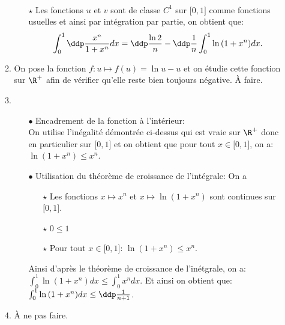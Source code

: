 \documentclass[a4paper, 11pt,reqno]{article}
\begin{document}
\begin{correction}
\begin{enumerate}
\begin{enumerate}
\begin{itemize}
$$\begin{array}{lllllll}
					                  \end{array}$$
				            \item[$\star$] Les fonctions $u$ et $v$ sont de classe $C^1$ sur $\lbrack 0,1\rbrack$ comme fonctions usuelles et ainsi par int\'egration par partie, on obtient que:
				                  $$\int_0^1 \ddp\frac{x^n}{1+x^n} dx = \ddp\frac{\ln{2}}{n}-\ddp\frac{1}{n}\int_0^1 \ln{(1+x^n)}dx  .$$
			            \end{itemize}
			      \item On pose la fonction $f: u\mapsto f(u)=\ln{u}-u$ et on \'etudie cette fonction sur $\R^{+}$ afin de v\'erifier qu'elle reste bien toujours n\'egative. \`{A} faire.
			      \item
			            \begin{itemize}
				            \item[$\bullet$] Encadrement de la fonction \`{a} l'int\'erieur:\\
				                  \noindent On utilise l'in\'egalit\'e d\'emontr\'ee ci-dessus qui est vraie sur $\R^+$ donc en particulier sur $\lbrack 0,1\rbrack$ et on obtient que pour tout $x\in\lbrack 0,1\rbrack$, on a: $\ln{(1+x^n)}\leq x^n$.
				            \item[$\bullet$] Utilisation du th\'eor\`{e}me de croissance de l'int\'egrale: On a
				                  \begin{itemize}
					                  \item[$\star$] Les fonctions $x\mapsto x^n$ et $x\mapsto \ln{(1+x^n)}$ sont continues sur $\lbrack 0,1\rbrack$.
					                  \item[$\star$] $0\leq 1$
					                  \item[$\star$] Pour tout $x\in\lbrack 0,1\rbrack$: $\ln{(1+x^n)}\leq x^n$.
				                  \end{itemize}
				                  Ainsi d'apr\`{e}s le th\'eor\`{e}me de croissance de l'in\'etgrale, on a: $\int_0^1 \ln{(1+x^n)}dx \leq \int_0^1 x^ndx$. Et ainsi on obtient que: $\int_0^1 \ln{(1+x^n)}dx \leq \ddp\frac{1}{n+1}$.
			            \end{itemize}
			      \item \`{A} ne pas faire.
		      \end{enumerate}
	\end{enumerate}
\end{correction}
\end{document}
